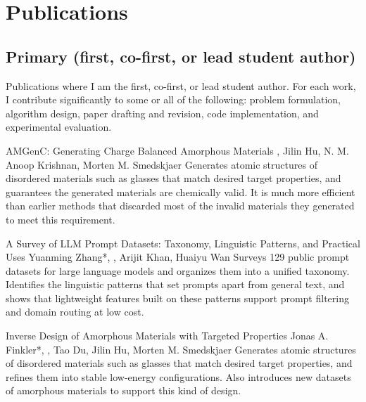 \label{sec:publications}
\section*{Publications}

\subsection*{Primary (first, co-first, or lead student author)}
Publications where I am the first, co-first, or lead student author. For each work, I contribute significantly to some or all of the following: problem formulation, algorithm design, paper drafting and revision, code implementation, and experimental evaluation.

{AMGenC: Generating Charge Balanced Amorphous Materials}
{\me, Jilin Hu, N. M. Anoop Krishnan, Morten M. Smedskjaer}
{Generates atomic structures of disordered materials such as glasses that match desired target properties, and guarantees the generated materials are chemically valid. It is much more efficient than earlier methods that discarded most of the invalid materials they generated to meet this requirement.}

{A Survey of LLM Prompt Datasets: Taxonomy, Linguistic Patterns, and Practical Uses}
{Yuanming Zhang*, \me*, Arijit Khan, Huaiyu Wan}
{Surveys 129 public prompt datasets for large language models and organizes them into a unified taxonomy. Identifies the linguistic patterns that set prompts apart from general text, and shows that lightweight features built on these patterns support prompt filtering and domain routing at low cost.}

{Inverse Design of Amorphous Materials with Targeted Properties}
{Jonas A. Finkler*, \me*, Tao Du, Jilin Hu, Morten M. Smedskjaer}
{Generates atomic structures of disordered materials such as glasses that match desired target properties, and refines them into stable low-energy configurations. Also introduces new datasets of amorphous materials to support this kind of design.}

